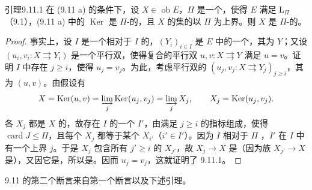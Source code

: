 \begin{SGAresult}{引理}{9.11.1}
在 (9.11 a) 的条件下，设 $X\in\operatorname{ob}E$，$\Pi$ 是一个，使得 $E$ 满足 $\mathrm L_\Pi$（9.1），(9.11 a) 中的 $\operatorname{Ker}$ 是 $\Pi$-的，且 $X$ 的集的以 $\Pi$ 为上界。则 $X$ 是 $\Pi$-的。
\end{SGAresult}
\begin{proof}
事实上，设 $I$ 是一个相对于 $I$  的，$(Y_i)_{i\in I}$ 是 $E$ 中的一个，其为 $Y$；又设 $(u_i,v_i:X\rightrightarrows Y_i)$ 是一个平行双，使得复合的平行双 $u,v:X\rightrightarrows Y$ 满足 $u=v$。证明 $I$ 中存在 $j\geq i$，使得 $u_j=v_j$。为此，考虑平行双的 $(u_j,v_j:X\rightrightarrows Y_j)_{j\geq i}$，其为 $(u,v)$。由假设有
\[
X=\operatorname{Ker}(u,v)=\varinjlim_j\operatorname{Ker}(u_j,v_j)
=\varinjlim_jX_j,
\qquad X_j=\operatorname{Ker}(u_j,v_j).
\]
各 $X_j$ 都是 $X$ 的，故存在 $I$ 的一个 $I'$，由满足 $j\geq i$ 的指标组成，使得 $\operatorname{card}J\leq\Pi$，且每个 $X_j$ 都等于某个 $X_{i'}$（$i'\in I'$）。因为 $I$ 相对于 $\Pi$ ，$I'$ 在 $I$ 中有一个上界 $j$。于是 $X_j$ 包含所有 $j'\geq i$ 的 $X_{j'}$，故 $X_j\to X$ 是（因为族 $X_{j'}\to X$ 是），又因它是，所以是。因而 $u_j=v_j$，这就证明了 9.11.1。
\end{proof}

9.11 的第二个断言来自第一个断言以及下述引理。

